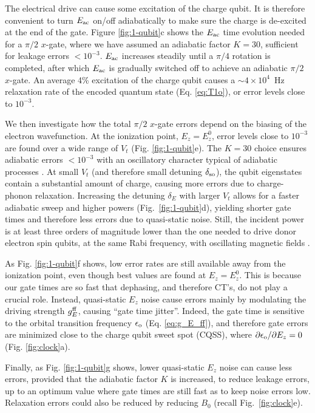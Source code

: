 \documentclass[aps,prb,superscriptaddress,nobibnotes,preprint]{revtex4-1}%
\begin{document}
The electrical drive can cause some excitation of the charge qubit. It is therefore convenient to turn $E_{\rm ac}$ on/off adiabatically to make sure the charge is de-excited at the end of the gate. Figure \ref{fig:1-qubit}c shows the $E_{\rm ac}$ time evolution needed for a $\pi/2$ $x$-gate, where we have assumed an adiabatic factor $K=30$, sufficient for leakage errors $<10^{-3}$. $E_{\rm ac}$ increases steadily until a $\pi/4$ rotation is completed, after which $E_{\rm ac}$ is gradually switched off to achieve an adiabatic $\pi/2$ $x$-gate. An average 4\% excitation of the charge qubit causes a $\sim4\times10^4$~Hz relaxation rate of the encoded quantum state (Eq. \ref{eq:T1o}), or error levels close to $10^{-3}$. 

We then investigate how the total $\pi/2$ $x$-gate errors depend on the biasing of the electron wavefunction. At the ionization point, $E_z=E_z^0$, error levels close to $10^{-3}$ are found over a wide range of $V_t$ (Fig. \ref{fig:1-qubit}e). The $K=30$ choice ensures adiabatic errors $<10^{-3}$ with an oscillatory character typical of adiabatic processes \cite{Oh2013}. At small $V_t$ (and therefore small detuning $\delta_{\rm so}$), the qubit eigenstates contain a substantial amount of charge, causing more errors due to charge-phonon relaxation. Increasing the detuning $\delta_E$ with larger $V_t$ allows for a faster adiabatic sweep and higher powers (Fig.~\ref{fig:1-qubit}d), yielding shorter gate times and therefore less errors due to quasi-static noise. Still, the incident power is at least three orders of magnitude lower than the one needed to drive donor electron spin qubits, at the same Rabi frequency, with oscillating magnetic fields \cite{Pla2012,Muhonen2014}.

As Fig. \ref{fig:1-qubit}f shows, low error rates are still available away from the ionization point, even though best values are found at $E_z=E_z^0$. This is because our gate times are so fast that dephasing, and therefore CT's, do not play a crucial role. Instead, quasi-static $E_z$ noise cause errors mainly by modulating the driving strength $g_E^{\rm ff}$, causing ``gate time jitter''. Indeed, the gate time is sensitive to the orbital transition frequency $\epsilon_{\rm o}$ (Eq. \ref{eq:g_E_ff}), and therefore gate errors are minimized close to the charge qubit sweet spot (CQSS), where $\partial\epsilon_{\rm o}/\partial E_z=0$ (Fig. \ref{fig:clock}a).

Finally, as Fig. \ref{fig:1-qubit}g shows, lower quasi-static $E_z$ noise can cause less errors, provided that the adiabatic factor $K$ is increased, to reduce leakage errors, up to an optimum value where gate times are still fast as to keep noise errors low. Relaxation errors could also be reduced by reducing $B_0$ (recall Fig.~\ref{fig:clock}e).
\end{document}
